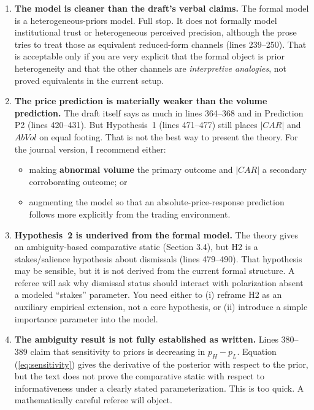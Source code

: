 \documentclass[12pt]{article}
\begin{document}
\begin{enumerate}
    \item \textbf{The model is cleaner than the draft's verbal claims.} The formal model is a heterogeneous-priors model. Full stop. It does not formally model institutional trust or heterogeneous perceived precision, although the prose tries to treat those as equivalent reduced-form channels (lines 239--250). That is acceptable only if you are very explicit that the formal object is prior heterogeneity and that the other channels are \emph{interpretive analogies}, not proved equivalents in the current setup.

    \item \textbf{The price prediction is materially weaker than the volume prediction.} The draft itself says as much in lines 364--368 and in Prediction P2 (lines 420--431). But Hypothesis~1 (lines 471--477) still places $|CAR|$ and $AbVol$ on equal footing. That is not the best way to present the theory. For the journal version, I recommend either:
    \begin{itemize}
        \item making \textbf{abnormal volume} the primary outcome and $|CAR|$ a secondary corroborating outcome; or
        \item augmenting the model so that an absolute-price-response prediction follows more explicitly from the trading environment.
    \end{itemize}

    \item \textbf{Hypothesis~2 is underived from the formal model.} The theory gives an ambiguity-based comparative static (Section 3.4), but H2 is a stakes/salience hypothesis about dismissals (lines 479--490). That hypothesis may be sensible, but it is not derived from the current formal structure. A referee will ask why dismissal status should interact with polarization absent a modeled ``stakes'' parameter. You need either to (i) reframe H2 as an auxiliary empirical extension, not a core hypothesis, or (ii) introduce a simple importance parameter into the model.

    \item \textbf{The ambiguity result is not fully established as written.} Lines 380--389 claim that sensitivity to priors is decreasing in $p_H-p_L$. Equation (\ref{eq:sensitivity}) gives the derivative of the posterior with respect to the prior, but the text does not prove the comparative static with respect to informativeness under a clearly stated parameterization. This is too quick. A mathematically careful referee will object.


\end{enumerate}
\end{document}
